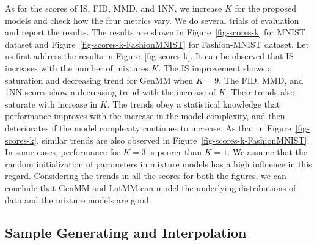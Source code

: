As for the scores of IS, FID, MMD, and 1NN, we increase $K$ for the proposed models and check
how the four metrics vary. We do several trials of evaluation and
report the results. The results are shown in
Figure~\ref{fig-scores-k} for MNIST dataset and
Figure~\ref{fig-scores-k-FashionMNIST} for Fashion-MNIST dataset. Let us
first address the results in Figure~\ref{fig-scores-k}. It can be
observed that IS increases with the number of mixtures $K$. The IS
improvement shows a saturation and decreasing trend for GenMM when
$K=9$. The FID, MMD, and 1NN scores show a decreasing trend with the
increase of $K$. Their trends also saturate with increase in $K$. The
trends obey a statistical knowledge that performance improves with
the increase in the model complexity, and then deteriorates if the model
complexity continues to increase. As that in Figure~\ref{fig-scores-k}, similar trends are also observed in Figure~\ref{fig-scores-k-FashionMNIST}. In some cases, performance for $K=3$ is poorer than $K=1$. We assume that the random initialization of parameters in mixture models has a high influence in this regard. 
Considering the trends in all the scores for both the figures, we can conclude that GenMM and LatMM can model the underlying distributions of data and the mixture models are good.

\subsection{Sample Generating and Interpolation}


